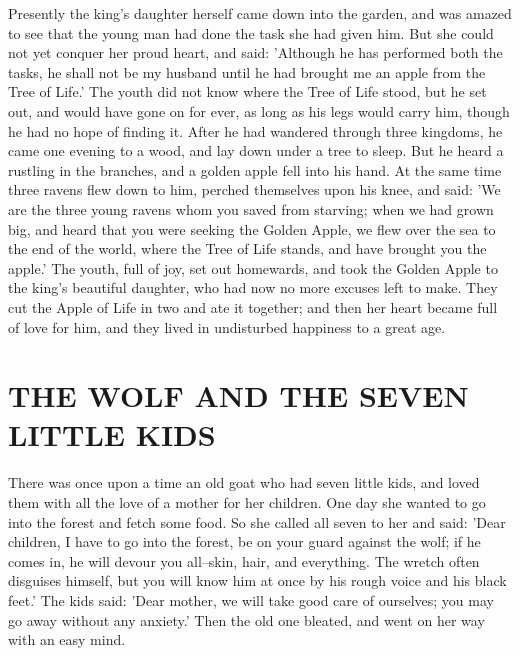 \documentclass[12pt]{book}
\begin{document}
Presently the king's daughter herself came down into the garden, and
was amazed to see that the young man had done the task she had given
him. But she could not yet conquer her proud heart, and said:
'Although he has performed both the tasks, he shall not be my husband
until he had brought me an apple from the Tree of Life.' The youth did
not know where the Tree of Life stood, but he set out, and would have
gone on for ever, as long as his legs would carry him, though he had
no hope of finding it. After he had wandered through three kingdoms,
he came one evening to a wood, and lay down under a tree to sleep. But
he heard a rustling in the branches, and a golden apple fell into his
hand. At the same time three ravens flew down to him, perched
themselves upon his knee, and said: 'We are the three young ravens
whom you saved from starving; when we had grown big, and heard that
you were seeking the Golden Apple, we flew over the sea to the end of
the world, where the Tree of Life stands, and have brought you the
apple.' The youth, full of joy, set out homewards, and took the Golden
Apple to the king's beautiful daughter, who had now no more excuses
left to make. They cut the Apple of Life in two and ate it together;
and then her heart became full of love for him, and they lived in
undisturbed happiness to a great age.



\chapter{THE WOLF AND THE SEVEN LITTLE KIDS}

There was once upon a time an old goat who had seven little kids, and
loved them with all the love of a mother for her children. One day she
wanted to go into the forest and fetch some food. So she called all
seven to her and said: 'Dear children, I have to go into the forest,
be on your guard against the wolf; if he comes in, he will devour you
all--skin, hair, and everything. The wretch often disguises himself,
but you will know him at once by his rough voice and his black feet.'
The kids said: 'Dear mother, we will take good care of ourselves; you
may go away without any anxiety.' Then the old one bleated, and went
on her way with an easy mind.
\end{document}
